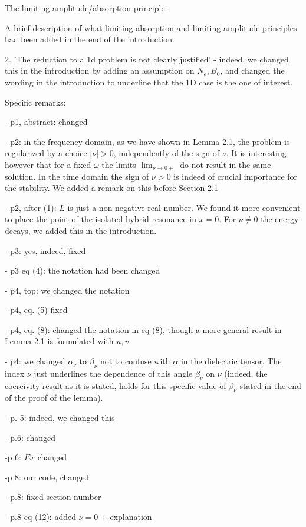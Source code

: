 \documentclass[a4paper,10pt]{article}
\begin{document}
The limiting amplitude/absorption principle: 

A brief description of what limiting absorption and limiting amplitude principles had been added in the end of the introduction.

2. 'The reduction to a 1d problem is not clearly justified' - indeed, we changed this in the introduction by adding an assumption on $N_e, B_0$, 
and changed the wording in the introduction to underline that the 1D case is the one of interest. 


Specific remarks: 

- p1, abstract: changed

- p2: in the frequency domain, as we have shown in Lemma 2.1, the problem is regularized by a choice $|\nu|>0$, independently of the sign of $\nu$. 
It is interesting however that for a fixed $\omega$ the limits $\lim_{\nu\rightarrow 0\pm}$ do not result in the same solution. 
In the time domain the sign of $\nu>0$ is indeed of crucial importance for the stability. We added a remark on this before Section 2.1  

- p2, after (1): $L$ is just a non-negative real number. We found it more convenient to place the point of the isolated hybrid resonance in $x=0$.
For $\nu\neq 0$ the energy decays, we added this in the introduction.


- p3: yes, indeed, fixed

- p3 eq (4): the notation had been changed
  
- p4, top: we changed the notation 

- p4, eq. (5) fixed

- p4, eq. (8): changed the notation in eq (8), though a more general result in Lemma 2.1 is formulated with $u,v$. 

- p4: we changed $\alpha_{\nu}$ to $\beta_{\nu}$ not to confuse with $\alpha$ in the dielectric tensor. The index $\nu$ 
just underlines the dependence of this angle $\beta_{\nu}$ on $\nu$ (indeed, the coercivity result as it is stated, holds for this specific value of $\beta_{\nu}$ stated 
in the end of the proof of the lemma).

- p. 5: indeed, we changed this 

- p.6:  changed

-p 6: $Ex$ changed

-p 8: our code, changed

 - p.8: fixed section number
 
 - p.8 eq (12): added $\nu=0$ + explanation
 
\end{document}
